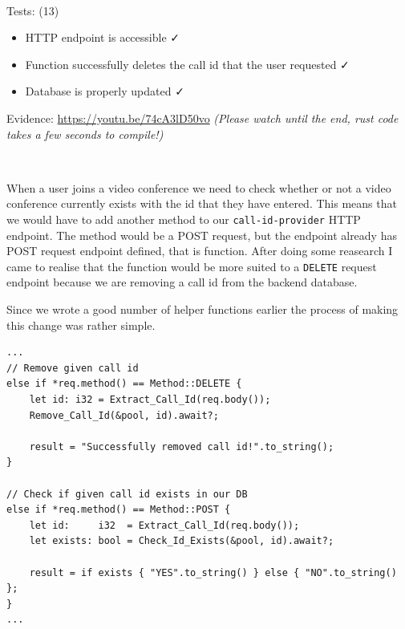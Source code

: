 {\color{gray} \hrulefill} \\ \vspace{0.2cm}

{\sffamily Tests: (13)}

\begin{itemize}
\item HTTP endpoint is accessible \faCheck \\
\item Function successfully deletes the call id that the user requested \faCheck \\
\item Database is properly updated \faCheck \\
\end{itemize}

{\sffamily Evidence:} \url{https://youtu.be/74cA3lD50vo}
\textit{(Please watch until the end, rust code takes a
few seconds to compile!)}

{\color{gray} \hrulefill} \\ \vspace{0.2cm}

When a user joins a video conference we need to check whether or
not a video conference currently exists with the id that they
have entered. This means that we would have to add another
method to our \texttt{call-id-provider} HTTP endpoint. The
method would be a POST request, but the endpoint already has
POST request endpoint defined, that is 
function. After doing some reasearch I came to realise that
the  function would be more suited to
a \texttt{DELETE} request endpoint because we are removing a
call id from the backend database. \\ \vspace{0.2cm}

Since we wrote a good number of helper functions earlier the
process of making this change was rather simple.

\begin{verbatim}
...
// Remove given call id
else if *req.method() == Method::DELETE {
    let id: i32 = Extract_Call_Id(req.body());
    Remove_Call_Id(&pool, id).await?;

    result = "Successfully removed call id!".to_string();
}

// Check if given call id exists in our DB
else if *req.method() == Method::POST {
    let id:     i32  = Extract_Call_Id(req.body());
    let exists: bool = Check_Id_Exists(&pool, id).await?;

    result = if exists { "YES".to_string() } else { "NO".to_string() };
}
...
\end{verbatim}

